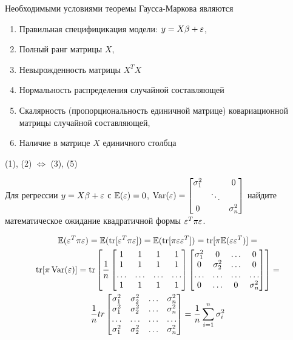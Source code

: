 \documentclass[pdftex,11pt,openany]{book}\usepackage[]{graphicx}\usepackage[]{color}
\begin{document}
\begin{problem}
Необходимыми условиями теоремы Гаусса-Маркова являются
\begin{enumerate}
\item Правильная специфицикация модели: $y = X\beta + \varepsilon$,
\item Полный ранг матрицы $X$,
\item Невырожденность матрицы $X^T X$
\item Нормальность распределения случайной составляющей
\item Скалярность (пропорциональность единичной матрице) ковариационной матрицы случайной составляющей,
\item Наличие в матрице $X$ единичного столбца
\end{enumerate}
\end{problem}

\begin{solution}
(1), (2) $\Leftrightarrow$ (3), (5)
\end{solution}


\begin{problem}
Для регрессии $y = X\beta + \varepsilon$ с $\mathbb{E}(\varepsilon) = 0$, $\operatorname{Var}(\varepsilon) = \begin{bmatrix}
\sigma_1^2 &  & 0 \\
  & \ddots &   \\
0 &  & \sigma^2_n
\end{bmatrix}$ найдите математическое ожидание квадратичной формы $\varepsilon^T \pi \varepsilon$.
\end{problem}


\begin{solution}
\begin{multline}
\mathbb{E}(\varepsilon^T \pi \varepsilon) = \mathbb{E}(\operatorname{tr}[\varepsilon^T \pi \varepsilon]) = \mathbb{E}(\operatorname{tr}[\pi \varepsilon \varepsilon^T]) = \operatorname{tr}[\pi \mathbb{E}(\varepsilon\varepsilon^T)]  =\\
\operatorname{tr}[\pi \operatorname{Var}(\varepsilon)] = \operatorname{tr}\left[ \frac{1}{n} \begin{bmatrix}
1 & 1 & 1 & 1 \\
1 & 1 & 1 & 1 \\
\ldots & \ldots & \ldots & \ldots \\
1 & 1 & 1 & 1 \\
\end{bmatrix} \begin{bmatrix}
\sigma_1^2 & 0 & \ldots & 0 \\
0 & \sigma_2^2 & \ldots & 0 \\
\ldots & \ldots & \ldots & \ldots \\
0 & \ldots & 0 & \sigma_n^2 \\
\end{bmatrix} \right] = \\
\frac{1}{n} tr\begin{bmatrix}
\sigma_1^2 & \sigma_2^2 & \ldots & \sigma_n^2 \\
\sigma_1^2 & \sigma_2^2 & \ldots & \sigma_n^2 \\
\ldots & \ldots & \ldots & \ldots \\
\sigma_1^2 & \sigma_2^2 & \ldots & \sigma_n^2 \\
\end{bmatrix} = \frac{1}{n} \sum_{i=1}^n \sigma_i^2
\end{multline}
\end{solution}
\end{document}
